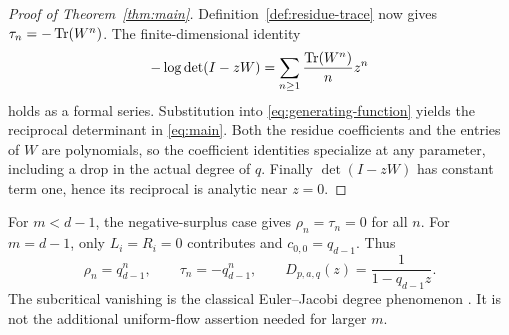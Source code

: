 \begin{proof}[Proof of Theorem~\ref{thm:main}]
Definition~\ref{def:residue-trace} now gives
$\tau_n=-\operatorname{Tr}(W^n)$. The finite-dimensional identity
\begin{equation}\label{eq:logdet}
 -\log\det(I-zW)=\sum_{n\ge1}\frac{\operatorname{Tr}(W^n)}{n}z^n
\end{equation}
holds as a formal series. Substitution into
\eqref{eq:generating-function} yields the reciprocal determinant in
\eqref{eq:main}. Both the residue coefficients and the entries of
$W$ are polynomials, so the coefficient identities specialize at any
parameter, including a drop in the actual degree of $q$.
Finally $\det(I-zW)$ has constant term one, hence its reciprocal is
analytic near $z=0$.
\end{proof}

\begin{remark}\label{rem:threshold}
For $m<d-1$, the negative-surplus case gives $\rho_n=\tau_n=0$ for
all $n$. For $m=d-1$, only $L_i=R_i=0$ contributes and
$c_{0,0}=q_{d-1}$. Thus
\[
 \rho_n=q_{d-1}^{n},\qquad
 \tau_n=-q_{d-1}^{n},\qquad
 D_{p,a,q}(z)=\frac{1}{1-q_{d-1}z}.
\]
The subcritical vanishing is the classical Euler--Jacobi degree
phenomenon \citep[Corollary~1.18 of the author preprint]{cattani1996residues}.
It is not the additional uniform-flow assertion needed
for larger $m$.
\end{remark}
